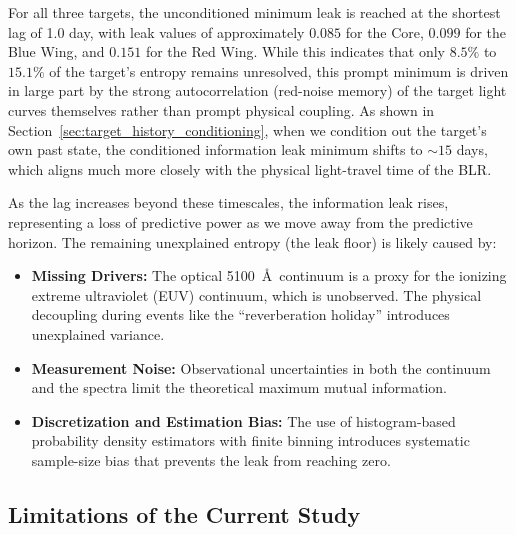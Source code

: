 \documentclass[12pt, a4paper]{article}
\begin{document}
For all three targets, the unconditioned minimum leak is reached at the shortest lag of 1.0 day, with leak values of approximately $0.085$ for the Core, $0.099$ for the Blue Wing, and $0.151$ for the Red Wing. While this indicates that only $8.5\%$ to $15.1\%$ of the target's entropy remains unresolved, this prompt minimum is driven in large part by the strong autocorrelation (red-noise memory) of the target light curves themselves rather than prompt physical coupling. As shown in Section~\ref{sec:target_history_conditioning}, when we condition out the target's own past state, the conditioned information leak minimum shifts to $\sim 15$ days, which aligns much more closely with the physical light-travel time of the BLR.

As the lag increases beyond these timescales, the information leak rises, representing a loss of predictive power as we move away from the predictive horizon. The remaining unexplained entropy (the leak floor) is likely caused by:
\begin{itemize}
\item \textbf{Missing Drivers:} The optical 5100~\AA\ continuum is a proxy for the ionizing extreme ultraviolet (EUV) continuum, which is unobserved. The physical decoupling during events like the ``reverberation holiday'' introduces unexplained variance.
\item \textbf{Measurement Noise:} Observational uncertainties in both the continuum and the spectra limit the theoretical maximum mutual information.
\item \textbf{Discretization and Estimation Bias:} The use of histogram-based probability density estimators with finite binning introduces systematic sample-size bias that prevents the leak from reaching zero.
\end{itemize}

\subsection{Limitations of the Current Study}
\label{sec:limitations}
\end{document}
